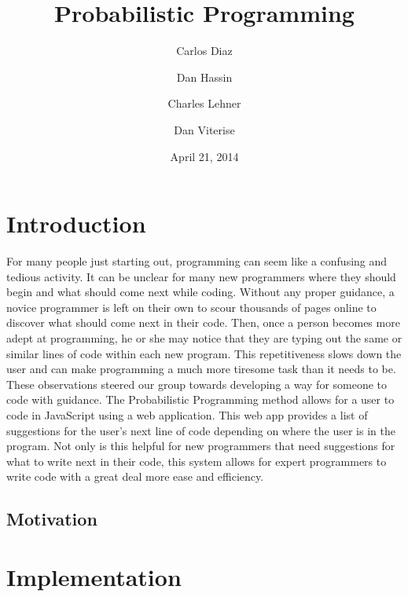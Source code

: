 \documentclass{article}
\title{
Probabilistic Programming
}
\author{
	Carlos Diaz
	\and
	Dan Hassin
	\and
	Charles Lehner
	\and
	Dan Viterise
}
\date{April 21, 2014}
\begin{document}
\maketitle


\section{Introduction}
For many people just starting out, programming can seem like a confusing and tedious activity. It can be unclear for 
many new programmers where they should begin and what should come next while coding. Without any proper guidance, 
a novice programmer is left on their own to scour thousands of pages online to discover what should come next in 
their code. Then, once a person becomes more adept at programming, he or she may notice that they are typing out 
the same or similar lines of code within each new program. This repetitiveness slows down the user and can make 
programming a much more tiresome task than it needs to be. These observations steered our group towards developing
a way for someone to code with guidance. The Probabilistic Programming method allows for a user to code in JavaScript
using a web application. This web app provides a list of suggestions for the user's next line of code depending on where
the user is in the program. Not only is this helpful for new programmers that need suggestions for what to write next 
in their code, this system allows for expert programmers to write code with a great deal more ease and efficiency.
\subsection{Motivation}


\section{Implementation}
\end{document}

